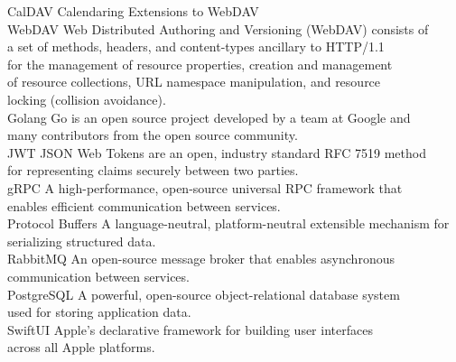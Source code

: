 \documentclass[12pt,a4paper,twoside]{report}
\begin{document}
\begin{singlespace}
\begin{tabbing}
        CalDAV \> Calendaring Extensions to WebDAV \\[0.5em]

        WebDAV \> Web Distributed Authoring and Versioning (WebDAV) consists of \\
        \> a set of methods, headers, and content-types ancillary to HTTP/1.1 \\
        \> for the management of resource properties, creation and management \\
        \> of resource collections, URL namespace manipulation, and resource \\
        \> locking (collision avoidance). \cite{def:WebDAV} \\[0.5em]

        Golang \> Go is an open source project developed by a team at Google and \\
        \> many contributors from the open source community. \cite{def:Golang} \\[0.5em]

        JWT \> JSON Web Tokens are an open, industry standard RFC 7519 method \\
        \> for representing claims securely between two parties. \cite{def:JWT} \\[0.5em]

        gRPC \> A high-performance, open-source universal RPC framework that \\
        \> enables efficient communication between services. \cite{def:grpc} \\[0.5em]

        Protocol Buffers \> A language-neutral, platform-neutral extensible mechanism for \\
        \> serializing structured data. \cite{def:protobuf} \\[0.5em]

        RabbitMQ \> An open-source message broker that enables asynchronous \\
        \> communication between services. \cite{def:rabbitmq} \\[0.5em]

        PostgreSQL \> A powerful, open-source object-relational database system \\
        \> used for storing application data. \cite{def:postgresql} \\[0.5em]

        SwiftUI \> Apple's declarative framework for building user interfaces \\
        \> across all Apple platforms. \cite{def:swiftui} \\[0.5em]


\end{tabbing}
\end{singlespace}
\end{document}

